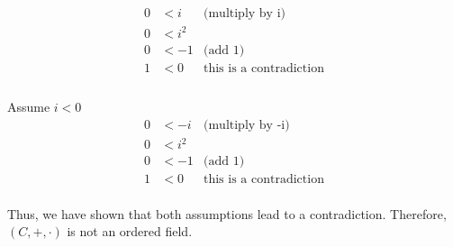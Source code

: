 \documentclass{article}
\begin{document}
\begin{align*}
   0 &< i & \text{(multiply by i)}\\
   0 &< i^2 & \text{}\\
   0 &< -1 & \text{(add 1)}\\
   1 &< 0 & \text{this is a contradiction}\\
\end{align*}
\\
Assume \(i < 0\)
\begin{align*}
   0 &< -i & \text{(multiply by -i)}\\
   0 &< i^2 & \text{}\\
   0 &< -1 & \text{(add 1)}\\
   1 &< 0 & \text{this is a contradiction}\\
\end{align*}

Thus, we have shown that both assumptions lead to a contradiction. Therefore, \((C, +, \cdot)\) is not an ordered field.
\end{document}
